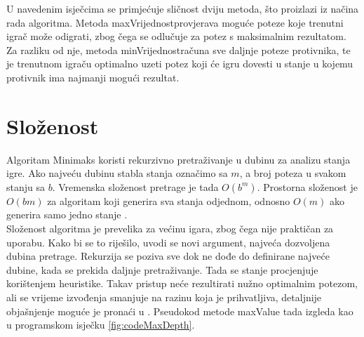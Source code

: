 \documentclass[times, utf8, seminar, numeric, tikz]{fer}
\begin{document}
U navedenim isječcima se primjećuje sličnost dviju metoda, što proizlazi iz načina rada algoritma. Metoda \ttfamily maxVrijednost\rmfamily\space provjerava moguće poteze koje trenutni igrač može odigrati, zbog čega se odlučuje za potez s maksimalnim rezultatom. Za razliku od nje, metoda \ttfamily minVrijednost\rmfamily\space računa sve daljnje poteze protivnika, te je trenutnom igraču optimalno uzeti potez koji će igru dovesti u stanje u kojemu protivnik ima najmanji mogući rezultat.\\

\begin{minipage}{\textwidth}
	
\end{minipage}

\begin{minipage}{\textwidth}
	
\end{minipage}

\section{Složenost}
Algoritam Minimaks koristi rekurzivno pretraživanje u dubinu za analizu stanja igre. Ako najveću dubinu stabla stanja označimo sa $m$, a broj poteza u svakom stanju sa $b$. Vremenska složenost pretrage je tada $O(b^m)$. Prostorna složenost je $O(bm)$ za algoritam koji generira sva stanja odjednom, odnosno $O(m)$ ako generira samo jedno stanje \cite{s.russellp.norvig2009}.\\

Složenost algoritma je prevelika za većinu igara, zbog čega nije praktičan za uporabu. Kako bi se to riješilo, uvodi se novi argument, najveća dozvoljena dubina pretrage. Rekurzija se poziva sve dok ne dođe do definirane najveće dubine, kada se prekida daljnje pretraživanje. Tada se stanje procjenjuje korištenjem heuristike. Takav pristup neće rezultirati nužno optimalnim potezom, ali se vrijeme izvođenja smanjuje na razinu koja je prihvatljiva, detaljnije objašnjenje moguće je pronaći u \cite{page1}. Pseudokod metode \ttfamily maxValue \rmfamily tada izgleda kao u programskom isječku \ref{fig:codeMaxDepth}. \\

\begin{minipage}{\textwidth}
	
\end{minipage}
\end{document}
